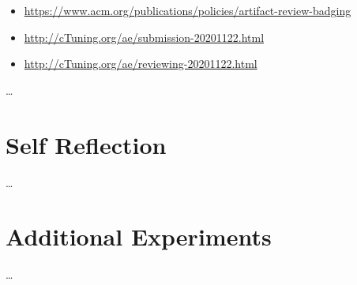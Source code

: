 \begin{itemize}
  \item \url{https://www.acm.org/publications/policies/artifact-review-badging}
  \item \url{http://cTuning.org/ae/submission-20201122.html}
  \item \url{http://cTuning.org/ae/reviewing-20201122.html}
\end{itemize}

\dots





\newpage
\chapter{Self Reflection}
\dots



\newpage
\chapter{Additional Experiments}
\dots




